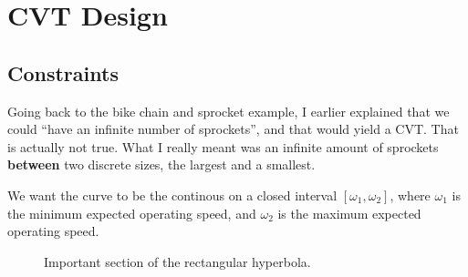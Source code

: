 \documentclass[12pt]{article}
\begin{document}
\section{CVT Design}

\subsection{Constraints}

Going back to the bike chain and sprocket example, I earlier explained that we could ``have an infinite number of sprockets'', and that would yield a CVT. That is actually not true. What I really meant was an infinite amount of sprockets \textbf{between} two discrete sizes, the largest and a smallest. 

We want the curve to be the continous on a closed interval $[\omega_{1},\omega_{2}]$, where $\omega_{1}$ is the minimum expected operating speed, and $\omega_{2}$ is the maximum expected operating speed. 

\begin{figure}[H]
  \centering
  
  \caption{Important section of the rectangular hyperbola.}\label{fig:omega_constraints}
\end{figure}
\end{document}
